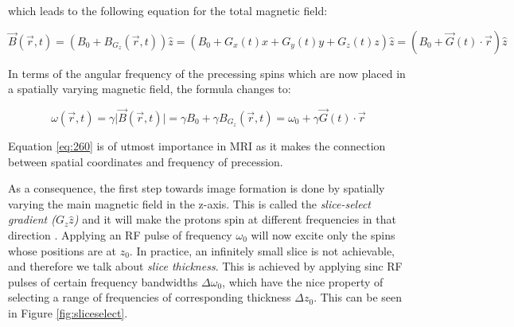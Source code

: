 which leads to the following equation for the total magnetic field:

\begin{equation}
    \vec{B}(\vec{r},t) = (B_0 + B_{G_z}(\vec{r}, t))\hat{z} = (B_0 + G_x(t)x + G_y(t)y + G_z(t)z) \hat{z} = (B_0 + \vec{G}(t) \cdot \vec{r}) \hat{z}
\end{equation}

In terms of the angular frequency of the precessing spins which are now placed in a spatially varying magnetic field, the formula changes to:

\begin{equation} \label{eq:260}
    \omega(\vec{r}, t) = \gamma \lvert \vec{B}(\vec{r}, t) \rvert = \gamma B_0 + \gamma B_{G_z} (\vec{r}, t) = \omega_0 + \gamma \vec{G}(t) \cdot \vec{r}
\end{equation}

Equation \ref{eq:260} is of utmost importance in MRI as it makes the connection between spatial coordinates and frequency of precession.

As a consequence, the first step towards image formation is done by spatially varying the main magnetic field in the z-axis. This is called the \textit{slice-select gradient ($G_z \hat{z}$)} and it will make the protons spin at different frequencies in that direction  \cite{Haacke1999}. Applying an RF pulse of frequency $\omega_0$ will now excite only the spins whose positions are at $z_0$. In practice, an infinitely small slice is not achievable, and therefore we talk about \textit{slice thickness}. This is achieved by applying sinc RF pulses of certain frequency bandwidths $\Delta \omega_0$, which have the nice property of selecting a range of frequencies of corresponding thickness $\Delta z_0$. This can be seen in Figure \ref{fig:sliceselect}. 

